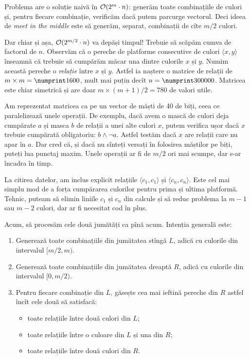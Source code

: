 \documentclass[../main.tex]{subfiles}
\begin{document}
Problema are o soluție naivă în $\mathcal{O}(2^m \cdot n)$: generăm toate combinațiile de culori și, pentru fiecare combinație, verificăm dacă putem parcurge vectorul. Deci ideea de \textit{meet in the middle} este să generăm, separat, combinații de cîte $m/2$ culori.

Dar chiar și așa, $\mathcal{O}(2^{m/2} \cdot n)$ va depăși timpul! Trebuie să scăpăm cumva de factorul de $n$. Observăm că o pereche de platforme consecutive de culori $\langle x,y \rangle$ înseamnă că trebuie să cumpărăm măcar una dintre culorile $x$ și $y$. Numim această pereche o \textit{relație} între $x$ și $y$. Astfel ia naștere o matrice de relații de $m \times m = \np{1600}$, mult mai puțin decît $n=\np{300000}$. Matricea este chiar simetrică și are doar $m \times (m + 1) / 2 = 780$ de valori utile.

Am reprezentat matricea ca pe un vector de măști de 40 de biți, ceea ce paralelizează unele operații. De exemplu, dacă avem o mască de culori deja cumpărate $a$ și masca $b$ de relații a unei alte culori $x$, putem verifica ușor dacă $x$ trebuie cumpărată obligatoriu: $b \land \neg a$. Astfel testăm dacă $x$ are relații care nu apar în $a$. Dar cred că, și dacă nu sînteți versați în folosirea măștilor pe biți, puteți lua punctaj maxim. Unele operații ar fi de $m/2$ ori mai scumpe, dar s-ar încadra în timp.

La citirea datelor, am inclus explicit relațiile $\langle c_1, c_1 \rangle$ și $\langle c_n, c_n \rangle$. Este cel mai simplu mod de a forța cumpărarea culorilor pentru prima și ultima platformă. Tehnic, puteam să elimin liniile $c_1$ și $c_n$ din calcule și să reduc problema la $m-1$ sau $m-2$ culori, dar ar fi necesitat cod în plus.

Acum, să procesăm cele două jumătăți ca pînă acum. Intenția generală este:

\begin{enumerate}
  \item Generează toate combinațiile din jumătatea stîngă $L$, adică cu culorile din intervalul $[m/2, m)$.

  \item Generează toate combinațiile din jumătatea dreaptă $R$, adică cu culorile din intervalul $[0,m/2)$.

  \item Pentru fiecare combinație din $L$, găsește cea mai ieftină pereche din $R$ astfel încît cele două să satisfacă:

  \begin{itemize}
    \item toate relațiile între două culori din $L$;

    \item toate relațiile între o culoare din $L$ și una din $R$;

    \item toate relațiile între două culori din $R$.
  \end{itemize}
\end{enumerate}
\end{document}
